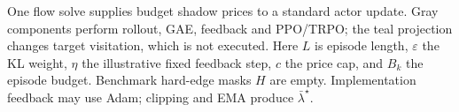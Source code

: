 One flow solve supplies budget shadow prices to a standard actor update. Gray components perform rollout, GAE, feedback and PPO/TRPO; the teal projection changes target visitation, which is not executed. Here $L$ is episode length, $\varepsilon$ the KL weight, $\eta$ the illustrative fixed feedback step, $c$ the price cap, and $B_k$ the episode budget. Benchmark hard-edge masks $H$ are empty. Implementation feedback may use Adam; clipping and EMA produce $\bar\lambda^\star$.
